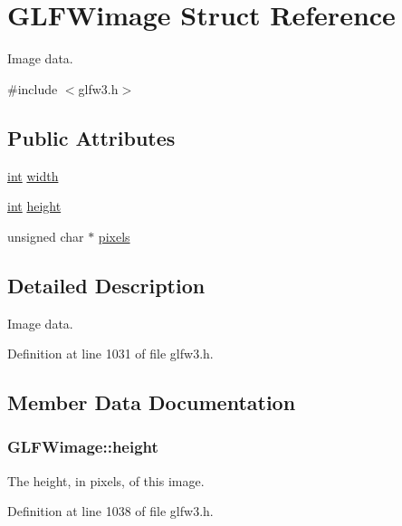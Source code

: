 \hypertarget{struct_g_l_f_wimage}{}\section{G\+L\+F\+Wimage Struct Reference}
\label{struct_g_l_f_wimage}


Image data.  




{\ttfamily \#include $<$glfw3.\+h$>$}

\subsection*{Public Attributes}
\begin{DoxyCompactItemize}
\item 
\hyperlink{wglew_8h_a500a82aecba06f4550f6849b8099ca21}{int} \hyperlink{struct_g_l_f_wimage_af6a71cc999fe6d3aea31dd7e9687d835}{width}
\item 
\hyperlink{wglew_8h_a500a82aecba06f4550f6849b8099ca21}{int} \hyperlink{struct_g_l_f_wimage_a0b7d95368f0c80d5e5c9875057c7dbec}{height}
\item 
unsigned char $\ast$ \hyperlink{struct_g_l_f_wimage_a0c532a5c2bb715555279b7817daba0fb}{pixels}
\end{DoxyCompactItemize}


\subsection{Detailed Description}
Image data. 

Definition at line 1031 of file glfw3.\+h.



\subsection{Member Data Documentation}
\hypertarget{struct_g_l_f_wimage_a0b7d95368f0c80d5e5c9875057c7dbec}{}
\subsubsection[{height}]{ G\+L\+F\+Wimage\+::height}\label{struct_g_l_f_wimage_a0b7d95368f0c80d5e5c9875057c7dbec}
The height, in pixels, of this image. 

Definition at line 1038 of file glfw3.\+h.

